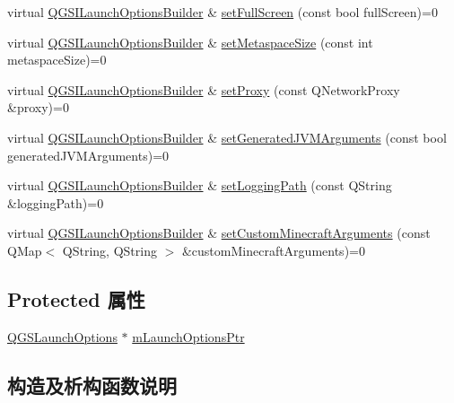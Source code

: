\begin{DoxyCompactItemize}
\item 
virtual \mbox{\hyperlink{class_q_g_s_i_launch_options_builder}{Q\+G\+S\+I\+Launch\+Options\+Builder}} \& \mbox{\hyperlink{class_q_g_s_i_launch_options_builder_ab3669bbcb9fc5602356cc05bc030b306}{set\+Full\+Screen}} (const bool full\+Screen)=0
\item 
virtual \mbox{\hyperlink{class_q_g_s_i_launch_options_builder}{Q\+G\+S\+I\+Launch\+Options\+Builder}} \& \mbox{\hyperlink{class_q_g_s_i_launch_options_builder_ad3e1730239e588aa35bfa6d7f0a761bd}{set\+Metaspace\+Size}} (const int metaspace\+Size)=0
\item 
virtual \mbox{\hyperlink{class_q_g_s_i_launch_options_builder}{Q\+G\+S\+I\+Launch\+Options\+Builder}} \& \mbox{\hyperlink{class_q_g_s_i_launch_options_builder_a73c506f75e24bc57493e8c7dbcc4c4d2}{set\+Proxy}} (const Q\+Network\+Proxy \&proxy)=0
\item 
virtual \mbox{\hyperlink{class_q_g_s_i_launch_options_builder}{Q\+G\+S\+I\+Launch\+Options\+Builder}} \& \mbox{\hyperlink{class_q_g_s_i_launch_options_builder_a4c29f3bf074aec2d11c5b661b9b95271}{set\+Generated\+J\+V\+M\+Arguments}} (const bool generated\+J\+V\+M\+Arguments)=0
\item 
virtual \mbox{\hyperlink{class_q_g_s_i_launch_options_builder}{Q\+G\+S\+I\+Launch\+Options\+Builder}} \& \mbox{\hyperlink{class_q_g_s_i_launch_options_builder_ac5f8f2487f876513c06c2ebb134607aa}{set\+Logging\+Path}} (const Q\+String \&logging\+Path)=0
\item 
virtual \mbox{\hyperlink{class_q_g_s_i_launch_options_builder}{Q\+G\+S\+I\+Launch\+Options\+Builder}} \& \mbox{\hyperlink{class_q_g_s_i_launch_options_builder_a3db1cb775f5004d68550c3f7e31f3cb1}{set\+Custom\+Minecraft\+Arguments}} (const Q\+Map$<$ Q\+String, Q\+String $>$ \&custom\+Minecraft\+Arguments)=0
\end{DoxyCompactItemize}
\subsection*{Protected 属性}
\begin{DoxyCompactItemize}
\item 
\mbox{\hyperlink{class_q_g_s_launch_options}{Q\+G\+S\+Launch\+Options}} $\ast$ \mbox{\hyperlink{class_q_g_s_i_launch_options_builder_abbbc14faf6a9c441b5611b2d5e1f4835}{m\+Launch\+Options\+Ptr}}
\end{DoxyCompactItemize}


\subsection{构造及析构函数说明}
\mbox{\label{class_q_g_s_i_launch_options_builder_a1f40a44ef9d9654919bdf27c4ec5d4b9}} 
